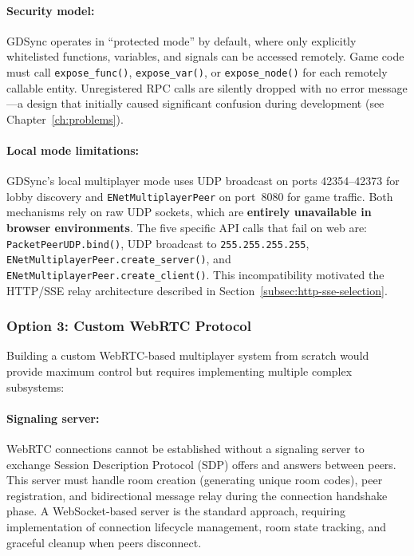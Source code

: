 \paragraph*{Security model:}
GDSync operates in ``protected mode'' by default, where only explicitly whitelisted functions, variables, and signals can be accessed remotely. Game code must call \texttt{expose\_func()}, \texttt{expose\_var()}, or \texttt{expose\_node()} for each remotely callable entity. Unregistered RPC calls are silently dropped with no error message---a design that initially caused significant confusion during development (see Chapter~\ref{ch:problems}).

\paragraph*{Local mode limitations:}
GDSync's local multiplayer mode uses UDP broadcast on ports 42354--42373 for lobby discovery and \texttt{ENetMultiplayerPeer} on port~8080 for game traffic. Both mechanisms rely on raw UDP sockets, which are \textbf{entirely unavailable in browser environments}. The five specific API calls that fail on web are: \texttt{PacketPeerUDP.bind()}, UDP broadcast to \texttt{255.255.255.255}, \texttt{ENetMultiplayerPeer.create\_server()}, and \texttt{ENetMultiplayerPeer.create\_client()}. This incompatibility motivated the HTTP/SSE relay architecture described in Section~\ref{subsec:http-sse-selection}.

\subsubsection*{Option 3: Custom WebRTC Protocol}

Building a custom WebRTC-based multiplayer system from scratch would provide maximum control but requires implementing multiple complex subsystems:

\paragraph*{Signaling server:}
WebRTC connections cannot be established without a signaling server to exchange Session Description Protocol (SDP) offers and answers between peers. This server must handle room creation (generating unique room codes), peer registration, and bidirectional message relay during the connection handshake phase. A WebSocket-based server is the standard approach, requiring implementation of connection lifecycle management, room state tracking, and graceful cleanup when peers disconnect.

